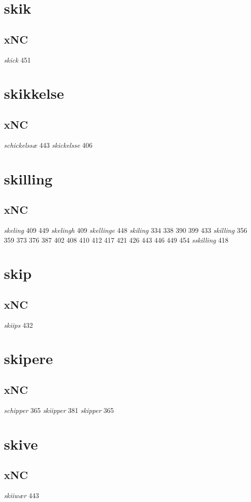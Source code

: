 \documentclass[a4paper,twocolumn]{article}
\begin{document}
\section{skik}
\label{sec:org59f26ee}
\subsection{xNC}
\label{sec:org597b138}
\emph{skick} 451 
\section{skikkelse}
\label{sec:org399e7de}
\subsection{xNC}
\label{sec:org74ee2a8}
\emph{schickelssæ} 443 \emph{skickelsse} 406 
\section{skilling}
\label{sec:org15e2c06}
\subsection{xNC}
\label{sec:org627d4e3}
\emph{skeling} 409 449 \emph{skelingh} 409 \emph{skellinge} 448 \emph{skiling} 334 338 390 399 433 \emph{skilling} 356 359 373 376 387 402 408 410 412 417 421 426 443 446 449 454 \emph{sskilling} 418 
\section{skip}
\label{sec:orge36f391}
\subsection{xNC}
\label{sec:orge6c648e}
\emph{skiips} 432 
\section{skipere}
\label{sec:orgd5345b6}
\subsection{xNC}
\label{sec:org4800867}
\emph{schipper} 365 \emph{skiipper} 381 \emph{skipper} 365 
\section{skive}
\label{sec:orgbe60f1e}
\subsection{xNC}
\label{sec:org208604a}
\emph{skiiwær} 443 
\end{document}
